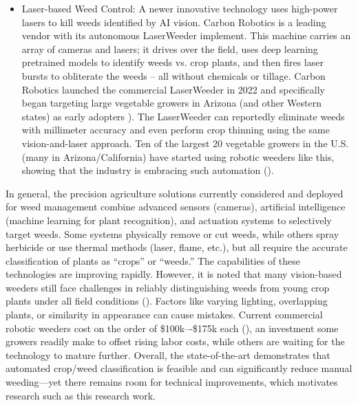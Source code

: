 \documentclass[letterpaper, notitlepage]{report}
\begin{document}
\begin{itemize}
	\item{Laser-based Weed Control: A newer innovative technology uses high-power lasers to kill weeds identified by AI vision. Carbon Robotics is a leading vendor with its autonomous LaserWeeder implement. This machine carries an array of cameras and lasers; it drives over the field, uses deep learning pretrained models to identify weeds vs. crop plants, and then fires laser bursts to obliterate the weeds – all without chemicals or tillage. Carbon Robotics launched the commercial LaserWeeder in 2022 and specifically began targeting large vegetable growers in Arizona (and other Western states) as early adopters \cite{It2023-fx}). The LaserWeeder can reportedly eliminate weeds with millimeter accuracy and even perform crop thinning using the same vision-and-laser approach. Ten of the largest 20 vegetable growers in the U.S. (many in Arizona/California) have started using robotic weeders like this, showing that the industry is embracing such automation (\cite{Belton2021-mv}).}

\end{itemize}

In general, the precision agriculture solutions currently  considered and deployed for weed management combine advanced sensors (cameras), artificial intelligence (machine learning for plant recognition), and actuation systems to selectively target weeds. Some systems physically remove or cut weeds, while others spray herbicide or use thermal methods (laser, flame, etc.), but all require the accurate classification of plants as “crops” or “weeds.” The capabilities of these technologies are improving rapidly. However, it is noted that many vision-based weeders still face challenges in reliably distinguishing weeds from young crop plants under all field conditions (\cite{American-Society-of-Agronomy2018-ad}). Factors like varying lighting, overlapping plants, or similarity in appearance can cause mistakes. Current commercial robotic weeders cost on the order of \$100k–-\$175k each (\cite{American-Society-of-Agronomy2018-ad}), an investment some growers readily make to offset rising labor costs, while others are waiting for the technology to mature further. Overall, the state-of-the-art demonstrates that automated crop/weed classification is feasible and can significantly reduce manual weeding—yet there remains room for technical improvements, which motivates research such as this research work.
\end{document}
